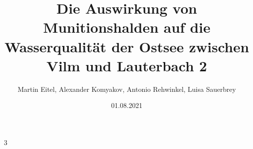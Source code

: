 \documentclass[12pt,titlepage]{article}
\begin{document}
\begin{titlepage}
\title{Die Auswirkung von Munitionshalden auf die Wasserqualität der Ostsee zwischen Vilm und Lauterbach 2}
\date{01.08.2021}
3
\author{Martin Eitel, Alexander Komyakov, Antonio Rehwinkel, Luisa Sauerbrey}
\maketitle
\end{titlepage}
\end{document}
